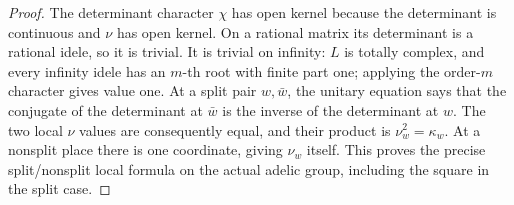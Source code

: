 \documentclass[11pt,a4paper]{article}
\numberwithin{equation}{section}
\theoremstyle{remark}\newtheorem{remark}[theorem]{Remark}
\begin{document}
\begin{proof}
The determinant character $\chi$ has open kernel because the
determinant is continuous and $\nu$ has open kernel.  On a
rational matrix its determinant is a rational idele, so it is
trivial.  It is trivial on infinity: $L$ is totally complex,
and every infinity idele has an $m$-th root with finite part one;
applying the order-$m$ character gives value one.
At a split pair $w,\bar w$, the unitary equation says that the
conjugate of the determinant at $\bar w$ is the inverse of the
determinant at $w$.  The two local $\nu$ values are consequently
equal, and their product is $\nu_w^2=\kappa_w$.  At a nonsplit
place there is one coordinate, giving $\nu_w$ itself.
This proves the precise split/nonsplit local formula on the
actual adelic group, including the square in the split case.
\end{proof}

\end{document}
